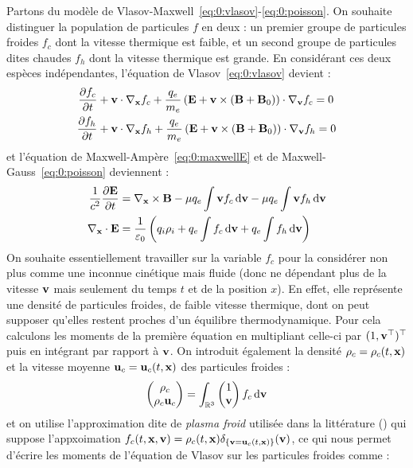 Partons du modèle de Vlasov-Maxwell~\eqref{eq:0:vlasov}-\eqref{eq:0:poisson}. On souhaite distinguer la population de particules $f$ en deux : un premier groupe de particules froides $f_c$ dont la vitesse thermique est faible, et un second groupe de particules dites chaudes $f_h$ dont la vitesse thermique est grande. En considérant ces deux espèces indépendantes, l'équation de Vlasov~\eqref{eq:0:vlasov} devient :
$$
	\begin{aligned}
	  \pdv{f_c}{t} &+ \vb{v}\cdot\nabla_{\vb{x}} f_c + \frac{q_e}{m_e}\left( \vb{E} + \vb{v}\times(\vb{B}+\vb{B}_0) \right)\cdot\nabla_{\vb{v}} f_c = 0 \\
	  \pdv{f_h}{t} &+ \vb{v}\cdot\nabla_{\vb{x}} f_h + \frac{q_e}{m_e}\left( \vb{E} + \vb{v}\times(\vb{B}+\vb{B}_0) \right)\cdot\nabla_{\vb{v}} f_h = 0
	\end{aligned}
$$
et l'équation de Maxwell-Ampère~\eqref{eq:0:maxwellE} et de Maxwell-Gauss~\eqref{eq:0:poisson} deviennent :
$$
	\begin{aligned}
  	\frac{1}{c^2}\pdv{\vb{E}}{t} &= \nabla_{\vb{x}}\times \vb{B} - \mu q_e\int \vb{v} f_c\dd{\vb{v}} - \mu q_e\int \vb{v} f_h\dd{\vb{v}} \\
	  \nabla_{\vb{x}}\cdot\vb{E} &= \frac{1}{\varepsilon_0}\left( q_i\rho_i + q_e\int f_c\dd{\vb{v}} + q_e\int f_h\dd{\vb{v}} \right)
	\end{aligned}
$$
On souhaite essentiellement travailler sur la variable $f_c$ pour la considérer non plus comme une inconnue cinétique mais fluide (donc ne dépendant plus de la vitesse $\vb{v}$ mais seulement du temps $t$ et de la position $x$). En effet, elle représente une densité de particules froides, de faible vitesse thermique, dont on peut supposer qu'elles restent proches d'un équilibre thermodynamique. Pour cela calculons les moments de la première équation en multipliant celle-ci par $(1,\vb{v}^\top)^\top$ puis en intégrant par rapport à $\vb{v}$. On introduit également la densité $\rho_c=\rho_c(t,\vb{x})$ et la vitesse moyenne $\vb{u}_c=\vb{u}_c(t,\vb{x})$ des particules froides :
$$
  \begin{pmatrix}
    \rho_c \\
    \rho_c \vb{u}_c
  \end{pmatrix}
  =
  \int_{\mathbb{R}^3} \begin{pmatrix}
    1 \\
    \vb{v}
  \end{pmatrix} f_c\dd{\vb{v}}
$$
et on utilise l'approximation dite de \emph{plasma froid} utilisée dans la littérature (\cite{Tronci:2014,Holderied:2019}) qui suppose l'appxoimation $f_c(t,\vb{x},\vb{v}) = \rho_c(t,\vb{x})\delta_{\{\vb{v}=\vb{u}_c(t,\vb{x})\}}(\vb{v})$, ce qui nous permet d'écrire les moments de l'équation de Vlasov sur les particules froides comme :
